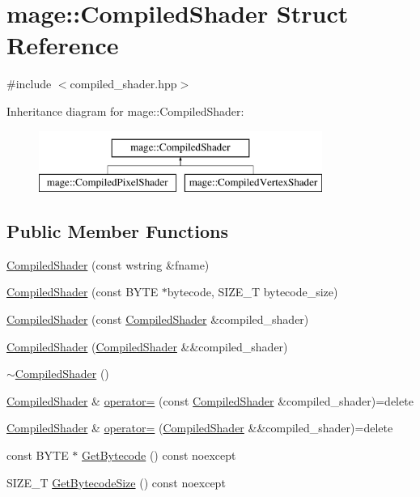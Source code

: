 \hypertarget{structmage_1_1_compiled_shader}{}\section{mage\+:\+:Compiled\+Shader Struct Reference}
\label{structmage_1_1_compiled_shader}


{\ttfamily \#include $<$compiled\+\_\+shader.\+hpp$>$}

Inheritance diagram for mage\+:\+:Compiled\+Shader\+:\begin{figure}[H]
\begin{center}
\leavevmode
\includegraphics[height=2.000000cm]{structmage_1_1_compiled_shader}
\end{center}
\end{figure}
\subsection*{Public Member Functions}
\begin{DoxyCompactItemize}
\item 
\hyperlink{structmage_1_1_compiled_shader_a64f6fea62d53c76a9ff01defc3c3c5ba}{Compiled\+Shader} (const wstring \&fname)
\item 
\hyperlink{structmage_1_1_compiled_shader_a65f35727484f6d21a1d793375c979e2a}{Compiled\+Shader} (const B\+Y\+TE $\ast$bytecode, S\+I\+Z\+E\+\_\+T bytecode\+\_\+size)
\item 
\hyperlink{structmage_1_1_compiled_shader_a421bb5715494eea7c13d3dbb88a191bc}{Compiled\+Shader} (const \hyperlink{structmage_1_1_compiled_shader}{Compiled\+Shader} \&compiled\+\_\+shader)
\item 
\hyperlink{structmage_1_1_compiled_shader_a8960c4c808bd170ca00a50c05148ae8c}{Compiled\+Shader} (\hyperlink{structmage_1_1_compiled_shader}{Compiled\+Shader} \&\&compiled\+\_\+shader)
\item 
\hyperlink{structmage_1_1_compiled_shader_a40805ed2bcd988824d130aeb07200f21}{$\sim$\+Compiled\+Shader} ()
\item 
\hyperlink{structmage_1_1_compiled_shader}{Compiled\+Shader} \& \hyperlink{structmage_1_1_compiled_shader_a0744c55c5847abe75b89b66ded5cda8b}{operator=} (const \hyperlink{structmage_1_1_compiled_shader}{Compiled\+Shader} \&compiled\+\_\+shader)=delete
\item 
\hyperlink{structmage_1_1_compiled_shader}{Compiled\+Shader} \& \hyperlink{structmage_1_1_compiled_shader_abaacfe0cbd94d14dde20d5ce2209c374}{operator=} (\hyperlink{structmage_1_1_compiled_shader}{Compiled\+Shader} \&\&compiled\+\_\+shader)=delete
\item 
const B\+Y\+TE $\ast$ \hyperlink{structmage_1_1_compiled_shader_a9de640fa51575dc77183d0864b4e8c42}{Get\+Bytecode} () const noexcept
\item 
S\+I\+Z\+E\+\_\+T \hyperlink{structmage_1_1_compiled_shader_a17df0554eb82bdbc24505c4c5d2b14da}{Get\+Bytecode\+Size} () const noexcept
\end{DoxyCompactItemize}
